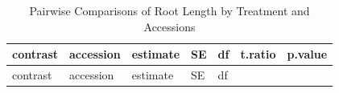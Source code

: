 \documentclass[
  11pt,
]{article}
\begin{document}
\begin{longtable}[]{@{}
  >{\raggedright\arraybackslash}p{}
  >{\raggedright\arraybackslash}p{}
  >{\raggedleft\arraybackslash}p{}
  >{\raggedleft\arraybackslash}p{}
  >{\raggedleft\arraybackslash}p{}
  >{\raggedleft\arraybackslash}p{}
  >{\raggedleft\arraybackslash}p{}@{}}
\caption{Pairwise Comparisons of Root Length by Treatment and
Accessions}\tabularnewline
\toprule\noalign{}
\begin{minipage}[b]{\linewidth}\raggedright
contrast
\end{minipage} & \begin{minipage}[b]{\linewidth}\raggedright
accession
\end{minipage} & \begin{minipage}[b]{\linewidth}\raggedleft
estimate
\end{minipage} & \begin{minipage}[b]{\linewidth}\raggedleft
SE
\end{minipage} & \begin{minipage}[b]{\linewidth}\raggedleft
df
\end{minipage} & \begin{minipage}[b]{\linewidth}\raggedleft
t.ratio
\end{minipage} & \begin{minipage}[b]{\linewidth}\raggedleft
p.value
\end{minipage} \\
\midrule\noalign{}
\endfirsthead
\toprule\noalign{}
\begin{minipage}[b]{\linewidth}\raggedright
contrast
\end{minipage} & \begin{minipage}[b]{\linewidth}\raggedright
accession
\end{minipage} & \begin{minipage}[b]{\linewidth}\raggedleft
estimate
\end{minipage} & \begin{minipage}[b]{\linewidth}\raggedleft
SE
\end{minipage} & \begin{minipage}[b]{\linewidth}\raggedleft
df
\end{minipage} & \begin{minipage}[b]{\linewidth}\raggedleft

\end{minipage}
\end{longtable}
\end{document}
